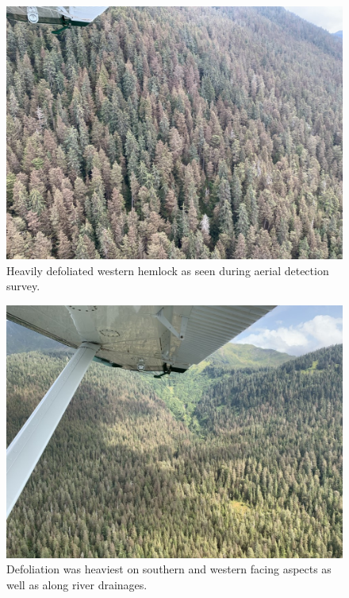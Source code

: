 \begin{multicols}{2}
\begin{figure}[H]
\begin{center}
\vspace{2mm}
\includegraphics[width=\textwidth]{img/hemlock_sawfly_defoliation.jpg}
\caption{Heavily defoliated western hemlock as seen during aerial detection survey.}
\label{hemlock_sawfly_defoliation}
\end{center}
\end{figure} 

\begin{figure}[H]
\begin{center}
\vspace{2mm}
\includegraphics[width=\textwidth]{img/hemlock_sawfly_defoliation_2.jpg}
\caption{Defoliation was heaviest on southern and western facing aspects as well as along river drainages.}
\label{hemlock_sawfly_defoliation_2}
\end{center}
\end{figure} 




\end{multicols}
